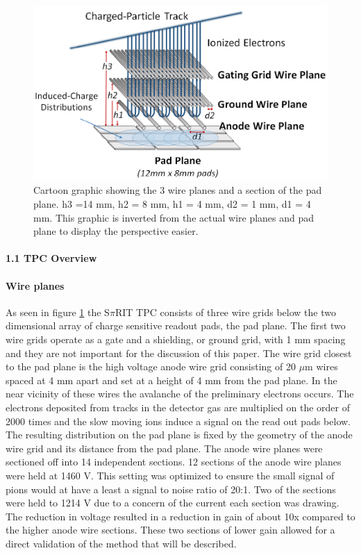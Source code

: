 \documentclass[review]{elsarticle}
\begin{document}
\begin{figure}[H]
\includegraphics[width=\linewidth]{padwire}
\caption{Cartoon graphic showing the 3 wire planes and a section of the pad plane. h3 =14 mm, h2 = 8 mm, h1 = 4 mm, d2 = 1 mm, d1 = 4 mm. This graphic is inverted from the actual wire planes and pad plane to display the perspective easier.}
\label{fig:padwire}
\end{figure}

\paragraph{1.1 TPC Overview}
\paragraph{Wire planes}
As seen in figure \ref{fig:padwire} the S$\pi$RIT TPC consists of three wire grids below the two dimensional array of charge sensitive readout pads, the pad plane. The first two wire grids operate as a gate and a shielding, or ground grid, with 1 mm spacing and they are not important for the discussion of this paper. The wire grid closest to the pad plane is the high voltage anode wire grid consisting of 20 $\mu$m wires spaced at 4 mm apart and set at a height of 4 mm from the pad plane. In the near vicinity of these wires the avalanche of the preliminary electrons occurs. The electrons deposited from tracks in the detector gas are multiplied on the order of 2000  times and the slow moving ions induce a signal on the read out pads below. The resulting distribution on the pad plane is fixed by the geometry of the anode wire grid and its distance from the pad plane. The anode wire planes were sectioned off into 14 independent sections. 12 sections of the anode wire planes were held at 1460 V. This setting was optimized to ensure the small signal of pions would at have a least a signal to noise ratio of 20:1. Two of the sections were held to 1214 V due to a concern of the current each section was drawing. The reduction in voltage resulted in a reduction in gain of about 10x compared to the higher anode wire sections. These two sections of lower gain allowed for a direct validation of the method that will be described. 
\end{document}
